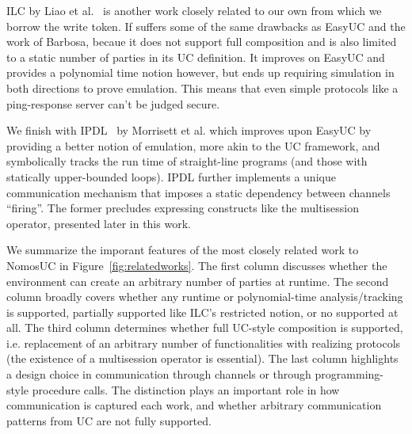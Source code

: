 ILC by Liao et al.~\cite{ilc} is another work closely related to our own from which we borrow the write token. If suffers some of the same drawbacks as EasyUC and the work of Barbosa, becaue it does not support full composition and is also limited to a static number of parties in its UC definition.
It improves on EasyUC and provides a polynomial time notion however, but ends up requiring simulation in both directions to prove emulation. 
This means that even simple protocols like a ping-response server can't be judged secure.

We finish with IPDL~\cite{ipdl} by Morrisett et al. which improves upon EasyUC by providing a better notion of emulation, more akin to the UC framework, and symbolically tracks the run time of straight-line programs (and those with statically upper-bounded loops).
IPDL further implements a unique communication mechanism that imposes a static dependency between channels ``firing''.
The former precludes expressing constructs like the multisession operator, presented later in this work. 

We summarize the imporant features of the most closely related work to NomosUC in Figure~\ref{fig:relatedworks}.
The first column discusses whether the environment can create an arbitrary number of parties at runtime. %
The second column broadly covers whether any runtime or polynomial-time analysis/tracking is supported, partially supported like ILC's restricted notion, or no supported at all. %
The third column determines whether full UC-style composition is supported, i.e. replacement of an arbitrary number of functionalities with realizing protocols (the existence of a multisession operator is essential). 
The last column highlights a design choice in communication through channels or through programming-style procedure calls.
The distinction plays an important role in how communication is captured each work, and whether arbitrary communication patterns from UC are not fully supported.


